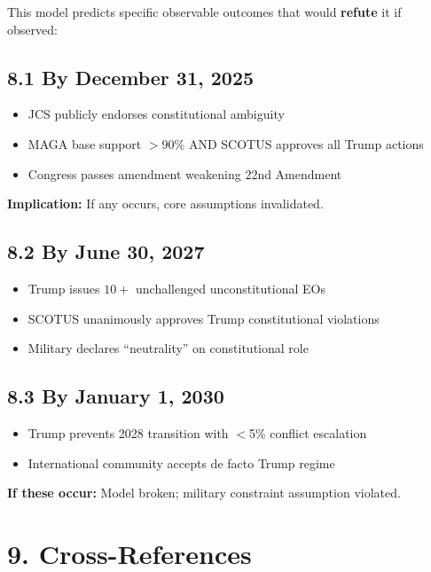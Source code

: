 This model predicts specific observable outcomes that would \textbf{refute} it if observed:

\subsection{8.1 By December 31, 2025}

\begin{itemize}
\item[ ] JCS publicly endorses constitutional ambiguity
\item[ ] MAGA base support $> 90\%$ AND SCOTUS approves all Trump actions
\item[ ] Congress passes amendment weakening 22nd Amendment
\end{itemize}

\textbf{Implication:} If any occurs, core assumptions invalidated.

\subsection{8.2 By June 30, 2027}

\begin{itemize}
\item[ ] Trump issues $10+$ unchallenged unconstitutional EOs
\item[ ] SCOTUS unanimously approves Trump constitutional violations
\item[ ] Military declares ``neutrality'' on constitutional role
\end{itemize}

\subsection{8.3 By January 1, 2030}

\begin{itemize}
\item[ ] Trump prevents 2028 transition with $<$5\% conflict escalation
\item[ ] International community accepts de facto Trump regime
\end{itemize}

\textbf{If these occur:} Model broken; military constraint assumption violated.

\section{9. Cross-References}

